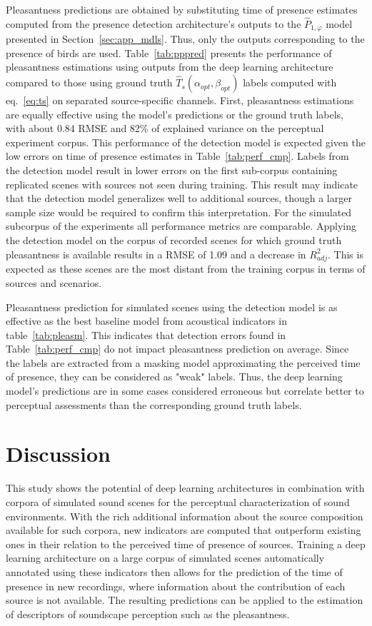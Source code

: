 \documentclass[twocolumn]{article}
\begin{document}
Pleasantness predictions are obtained by substituting time of presence estimates computed from the presence detection architecture's outputs to the $\hat P_{1, \varphi}$ model presented in Section~\ref{sec:app_mdls}. Thus, only the outputs corresponding to the presence of birds are used. Table~\ref{tab:pppred} presents the performance of pleasantness estimations using outputs from the deep learning architecture compared to those using ground truth $\hat T_s(\alpha_{opt}, \beta_{opt})$ labels computed with eq.~\ref{eq:ts} on separated source-specific channels. First, pleasantness estimations are equally effective using the model's predictions or the ground truth labels, with about 0.84 RMSE and 82\% of explained variance on the perceptual experiment corpus. This performance of the detection model is expected given the low errors on time of presence estimates in Table~\ref{tab:perf_cmp}. Labels from the detection model result in lower errors on the first sub-corpus containing replicated scenes with sources not seen during training. This result may indicate that the detection model generalizes well to additional sources, though a larger sample size would be required to confirm this interpretation. For the simulated subcorpus of the experiments all performance metrics are comparable. Applying the detection model on the corpus of recorded scenes for which ground truth pleasantness is available results in a RMSE of 1.09 and a decrease in $R^2_{adj}$. This is expected as these scenes are the most distant from the training corpus in terms of sources and scenarios.

Pleasantness prediction for simulated scenes using the detection model is as effective as the best baseline model from acoustical indicators in table~\ref{tab:pleasm}. This indicates that detection errors found in Table~\ref{tab:perf_cmp} do not impact pleasantness prediction on average. Since the labels are extracted from a masking model approximating the perceived time of presence, they can be considered as "weak" labels. Thus, the deep learning model's predictions are in some cases considered erroneous but correlate better to perceptual assessments than the corresponding ground truth labels.

\section{Discussion}
\label{sec:discussion}

This study shows the potential of deep learning architectures in combination with corpora of simulated sound scenes for the perceptual characterization of sound environments. With the rich additional information about the source composition available for such corpora, new indicators are computed that outperform existing ones in their relation to the perceived time of presence of sources. Training a deep learning architecture on a large corpus of simulated scenes automatically annotated using these indicators then allows for the prediction of the time of presence in new recordings, where information about the contribution of each source is not available. The resulting predictions can be applied to the estimation of descriptors of soundscape perception such as the pleasantness.
\end{document}
